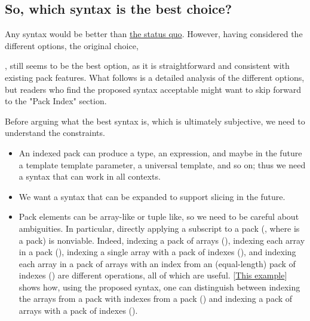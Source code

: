 \documentclass{wg21}
\begin{document}
\subsection{So, which syntax is the best choice?}

Any syntax would be better than
\href{https://twitter.com/incomputable/status/1590733659694583808}{the status quo}.
However, having considered the different options, the original choice,

, still seems to be the best option, as it is straightforward
and consistent with existing pack features.  What follows is a detailed
analysis of the different options, but readers who find the proposed syntax acceptable might want to skip forward to
the "Pack Index" section.

Before arguing what the best syntax is, which is ultimately subjective, we need to understand the constraints.
\begin{itemize}
\item An indexed pack can produce a type, an expression, and maybe in the future a template template parameter, a universal template, and so on; thus we need a syntax
that can work in all contexts.

\item We want a syntax that can be expanded to support slicing in the future.

\item Pack elements can be array-like or tuple like, so we need to be careful
  about ambiguities. In particular, directly applying a subscript to a pack
  (, where  is a pack) is nonviable. Indeed, indexing a
  pack of arrays (), indexing each array in a pack
  (), indexing a single array with a pack of indexes
  (), and indexing each array in a pack of arrays
  with an index from an (equal-length) pack of indexes
  () are different operations, all of which are
  useful. [\href{https://compiler-explorer.com/z/E86h8eMG1}{This example}]
  shows how, using the proposed syntax, one can distinguish between indexing
  the arrays from a pack with indexes from a pack
  () and indexing a pack of arrays with a pack
  of indexes ().
\end{itemize}

\subsubsection{}
\end{document}
